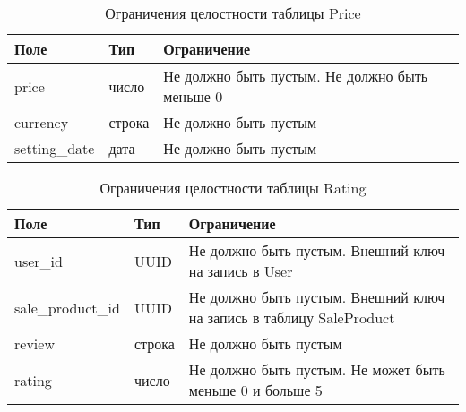 \begin{table}[ht]
	\begin{center}
		\begin{threeparttable}
			\caption{Ограничения целостности таблицы Price}
			\label{tbl:entity_price}
			\begin{tabular}{|p{4.5cm}|p{2.5cm}|p{8.5cm}|}
				\hline 
				\textbf{Поле} & \textbf{Тип} & \textbf{Ограничение}  \\
				\hline
				price & число & Не должно быть пустым. Не должно быть меньше 0  \\
				\hline
				currency & строка & Не должно быть пустым  \\
				\hline
				setting\_date & дата & Не должно быть пустым  \\
				\hline
			\end{tabular}
		\end{threeparttable}			
	\end{center}
\end{table}

\clearpage

\begin{table}[ht]
	\begin{center}
		\begin{threeparttable}
			\caption{Ограничения целостности таблицы Rating}
			\label{tbl:entity_rating}
			\begin{tabular}{|p{4.5cm}|p{2.5cm}|p{8.5cm}|}
				\hline 
				\textbf{Поле} & \textbf{Тип} & \textbf{Ограничение}  \\
				\hline
				user\_id & UUID & Не должно быть пустым. Внешний ключ на запись в User  \\
				\hline
				sale\_product\_id & UUID & Не должно быть пустым. Внешний ключ на запись в таблицу SaleProduct  \\
				\hline
				review & строка & Не должно быть пустым \\
				\hline
				rating & число & Не должно быть пустым. Не может быть меньше 0 и больше 5 \\
				\hline
			\end{tabular}
		\end{threeparttable}			
	\end{center}
\end{table}

